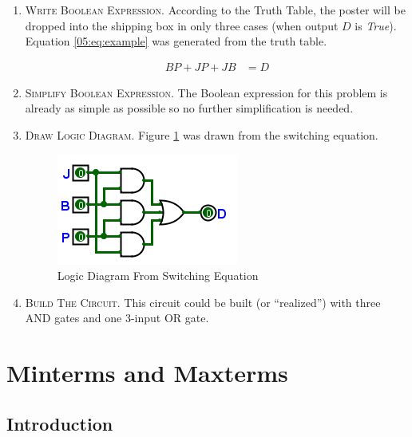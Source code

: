 \begin{enumerate}
  \item \textsc{Write Boolean Expression}. According to the Truth Table, the poster will be dropped into the shipping box in only three cases (when output $ D $ is \emph{True}). Equation \ref{05:eq:example} was generated from the truth table. 
  
  \begin{align}
  \label{05:eq:example}
  BP + JP + JB &= D 
  \end{align}
  
  \item \textsc{Simplify Boolean Expression}. The Boolean expression for this problem is already as simple as possible so no further simplification is needed. 
  
  \item \textsc{Draw Logic Diagram}. Figure \ref{fig:05_01} was drawn from the switching equation.
  
	\begin{figure}[H]
		\centering
		\includegraphics[width=\maxwidth{.95\linewidth}]{gfx/05_01}
		\caption{Logic Diagram From Switching Equation}
		\label{fig:05_01}
	\end{figure}
  
  \item \textsc{Build The Circuit}. This circuit could be built (or ``realized'') with three \textsf{AND}  gates and one 3-input \textsf{OR}  gate. 
  
\end{enumerate}

\section{Minterms and Maxterms}
\label{05:sec:minterms_and_maxterms}

\subsection{Introduction}
\label{05:subsec:introduction_to_minterms_and_maxterms}

